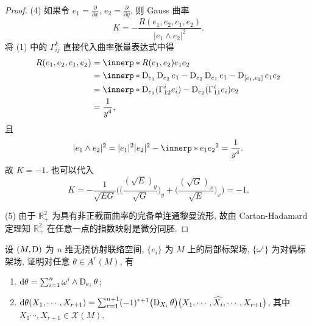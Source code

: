 \begin{proof}
  (4) 如果令 $e_1=\frac{\partial}{\partial x}$, $e_2=\frac{\partial}{\partial y}$,
  则 Gauss 曲率
  \[K = -\frac{R(e_1,e_2,e_1,e_2)}{|e_1\wedge e_2|^2}.\]
  将 (1) 中的 $\Gamma_{ij}^k$ 直接代入曲率张量表达式中得
  \begin{align*}
    R(e_1,e_2,e_1,e_2)
    & = \innerp*{R(e_1,e_2)e_1}{e_2} \\
    & = \innerp*{\D_{e_1}\D_{e_2}e_1-\D_{e_2}\D_{e_1}e_1-\D_{[e_1,e_2]}e_1}{e_2} \\
    & = \innerp*{\D_{e_1}(\Gamma_{12}^ie_i)-\D_{e_2}(\Gamma_{11}^ie_i)}{e_2} \\
    & = \frac{1}{y^4},
  \end{align*}
  且
  \[|e_1\wedge e_2|^2 = |e_1|^2|e_2|^2-\innerp*{e_1}{e_2}^2 = \frac{1}{y^4}.\]
  故 $K=-1$. 也可以代入
  \[K = -\frac{1}{\sqrt{EG}}\Biggl(\biggl(\frac{(\sqrt{E})_y}{\sqrt{G}}\biggr)_y
     + \biggl(\frac{(\sqrt{G})_x}{\sqrt{E}}\biggr)_x\Biggr) = -1.\]

  (5) 由于 $\mathbb{R}^2_+$ 为具有非正截面曲率的完备单连通黎曼流形,
  故由 Cartan-Hadamard 定理知 $\mathbb{R}^2_+$ 在任意一点的指数映射是微分同胚.
\end{proof}



\begin{exercise}
  设 $(M,\operatorname{D})$ 为 $n$ 维无挠仿射联络空间, $\{e_i\}$ 为 $M$ 上的局部标架场, $\{\omega^i\}$
  为对偶标架场, 证明对任意 $\theta\in A^r(M)$, 有
  \begin{enumerate}[(1)]
    \item $\mathop{}\!\mathrm{d}\theta = \sum_{i=1}^n \omega^i\wedge\operatorname{D}_{e_i}\theta$;
    \item $\mathop{}\!\mathrm{d}\theta(X_1,\cdots,X_{r+1}) = \sum_{r=1}^{n+1}(-1)^{r+1} \bigl(\operatorname{D}_{X_i}\theta\bigr)
      \bigl(X_1,\cdots,\widehat{X_i},\cdots,X_{r+1}\bigr)$, 其中 $X_1\cdots,X_{r+1}\in\mathscr{X}(M)$.
  \end{enumerate}
\end{exercise}


